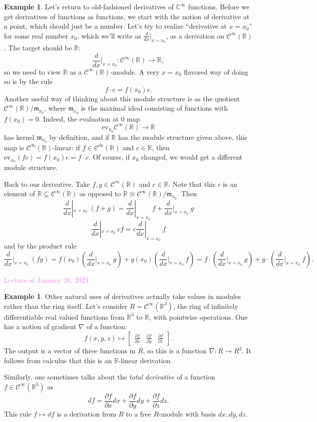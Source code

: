 \documentclass{amsart}[12pt]
\def\cC{\mathcal C}
\newcommand{\Jan}[1]{\textcolor{violet}{Lecture of January #1, 2023}}
\newcommand{\R}{{\mathbb{R}}}
\newcommand{\C}{\mathbb{C}}
\newcommand{\fm}{{\mathfrak m}}
\numberwithin{equation}{section}
\theoremstyle{plain} %
\theoremstyle{definition}
\newtheorem{ex}[equation]{Example}
\theoremstyle{remark}
\begin{document}
\begin{ex}
Let's return to old-fashioned derivatives of $\C^\infty$ functions. Before we get derivatives of functions as functions, we start with the notion of derivative at a point, which should just be a number. Let's try to realize ``derivative at $x=x_0$'' for some real number $x_0$, which we'll write as $\frac{d}{dx}|_{x=x_0}$, as a derivation on $\cC^{\infty}(\R)$. 
The target should be $\R$:
\[ \frac{d}{dx}|_{x=x_0} : \cC^{\infty}(\R) \to \R,\]
so we need to view $\R$ as a $\cC^{\infty}(\R)$-module. A very $x=x_0$ flavored way of doing so is by the rule
\[ f \cdot c = f(x_0) c.\]
Another useful way of thinking about this module structure is as the quotient $\cC^{\infty}(\R)/\fm_{x_0}$, where $\fm_{x_0}$ is the maximal ideal consisting of functions with $f(x_0)=0$. Indeed, the evaluation at $0$ map
\[ \mathrm{ev}_{x_0}  \cC^{\infty}(\R) \to \R\]
has kernel $\fm_{x_0}$ by definition, and if $\R$ has the module structure given above, this map is $\cC^{\infty}(\R)$-linear: if $f\in  \cC^{\infty}(\R)$ and $c\in \R$, then $\mathrm{ev}_{x_0}(fc) = f(x_0) c = f\cdot c$. Of course, if $x_0$ changed, we would get a different module structure.

Back to our derivative. Take $f,g\in \cC^{\infty}(\R)$ and $c\in \R$. Note that this $c$ is an element of $\R \subseteq \cC^{\infty}(\R)$ as opposed to $\R\cong \cC^{\infty}(\R)/\fm_{x_0}$. Then
\[  \frac{d}{dx}|_{x=x_0}\ (f+g) = \frac{d}{dx}|_{x=x_0}\ f + \frac{d}{dx}|_{x=x_0} \ g\]
\[ \frac{d}{dx}|_{x=x_0}\ cf = c \frac{d}{dx}|_{x=x_0}\ f \]
and by the product rule
\[ \frac{d}{dx}|_{x=x_0}\ (fg) =  f(x_0) (\frac{d}{dx}|_{x=x_0} \ g) +  g(x_0) (\frac{d}{dx}|_{x=x_0} \ f) = f \cdot  (\frac{d}{dx}|_{x=x_0}\ g) + g \cdot (\frac{d}{dx}|_{x=x_0}\ f).\]
\end{ex}




\Jan{26}

\begin{ex}
Other natural uses of derivatives actually take values in modules rather than the ring itself.
Let's consider $R=\cC^\infty(\R^3)$, the ring of infinitely differentiable real valued functions from $\R^3$ to $\R$, with pointwise operations. One has a notion of gradient $\nabla$ of a function:
\[ f(x,y,z) \mapsto \begin{bmatrix} \frac{\partial f}{\partial x} & \frac{\partial f}{\partial y} & \frac{\partial f}{\partial z} \end{bmatrix}.\]
The output is a vector of three functions in $R$, so this is a function $\nabla:R\to R^3$.
It follows from calculus that this is an $\R$-linear derivation.

Similarly, one sometimes talks about the \emph{total derivative} of a function $f\in \cC^\infty(\R^3)$ as
\[ df = \frac{\partial f}{\partial x} dx + \frac{\partial f}{\partial y} dy + \frac{\partial f}{\partial z} dz.\]
This rule $f\mapsto df$ is a derivation from $R$ to a free $R$-module with basis $dx,dy,dz$.
\end{ex}
\end{document}
